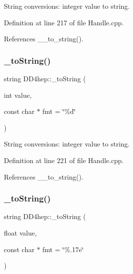 String conversions\+: integer value to string. 



Definition at line 217 of file Handle.\+cpp.



References \+\_\+\+\_\+to\+\_\+string().

\hypertarget{group___d_d4_h_e_p___g_e_o_m_e_t_r_y_ga7c5be2d7907e4e1d8ce7a2396b10b695}{}\label{group___d_d4_h_e_p___g_e_o_m_e_t_r_y_ga7c5be2d7907e4e1d8ce7a2396b10b695} 
\subsubsection{\texorpdfstring{\+\_\+to\+String()}{\_toString()}\hspace{0.1cm}{\footnotesize\ttfamily [3/5]}}
{\footnotesize\ttfamily string D\+D4hep\+::\+\_\+to\+String (\begin{DoxyParamCaption}\item[{int}]{value,  }\item[{const char $\ast$}]{fmt = {\ttfamily \char`\"{}\%d\char`\"{}} }\end{DoxyParamCaption})}



String conversions\+: integer value to string. 



Definition at line 221 of file Handle.\+cpp.



References \+\_\+\+\_\+to\+\_\+string().

\hypertarget{group___d_d4_h_e_p___g_e_o_m_e_t_r_y_ga0ade5df64f54ccda654522ce830b3c15}{}\label{group___d_d4_h_e_p___g_e_o_m_e_t_r_y_ga0ade5df64f54ccda654522ce830b3c15} 
\subsubsection{\texorpdfstring{\+\_\+to\+String()}{\_toString()}\hspace{0.1cm}{\footnotesize\ttfamily [4/5]}}
{\footnotesize\ttfamily string D\+D4hep\+::\+\_\+to\+String (\begin{DoxyParamCaption}\item[{float}]{value,  }\item[{const char $\ast$}]{fmt = {\ttfamily \char`\"{}\%.17e\char`\"{}} }\end{DoxyParamCaption})}



